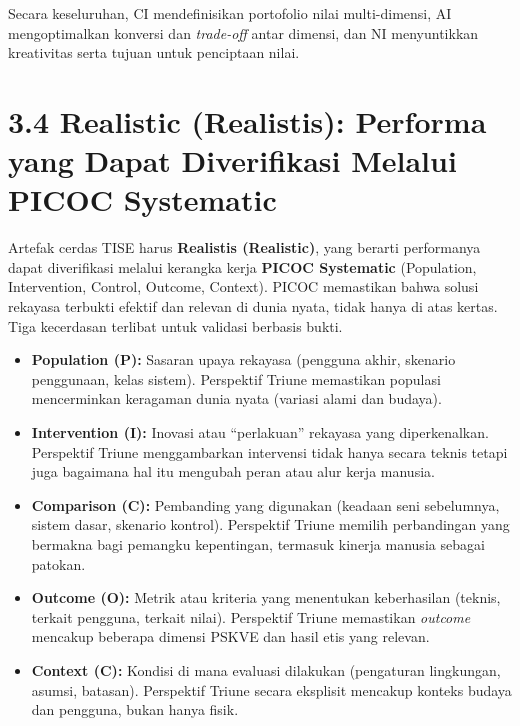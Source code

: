 \documentclass[
  letterpaper,
  DIV=11,
  numbers=noendperiod]{scrreprt}
\providecommand{\tightlist}{%
  \setlength{\itemsep}{0pt}\setlength{\parskip}{0pt}}
\begin{document}
Secara keseluruhan, CI mendefinisikan portofolio nilai multi-dimensi, AI
mengoptimalkan konversi dan \emph{trade-off} antar dimensi, dan NI
menyuntikkan kreativitas serta tujuan untuk penciptaan nilai.

\section{\texorpdfstring{\textbf{3.4 Realistic (Realistis): Performa
yang Dapat Diverifikasi Melalui PICOC
Systematic}}{3.4 Realistic (Realistis): Performa yang Dapat Diverifikasi Melalui PICOC Systematic}}\label{realistic-realistis-performa-yang-dapat-diverifikasi-melalui-picoc-systematic}

Artefak cerdas TISE harus \textbf{Realistis (Realistic)}, yang berarti
performanya dapat diverifikasi melalui kerangka kerja \textbf{PICOC
Systematic} (Population, Intervention, Control, Outcome, Context). PICOC
memastikan bahwa solusi rekayasa terbukti efektif dan relevan di dunia
nyata, tidak hanya di atas kertas. Tiga kecerdasan terlibat untuk
validasi berbasis bukti.

\begin{itemize}
\tightlist
\item
  \textbf{Population (P):} Sasaran upaya rekayasa (pengguna akhir,
  skenario penggunaan, kelas sistem). Perspektif Triune memastikan
  populasi mencerminkan keragaman dunia nyata (variasi alami dan
  budaya).
\item
  \textbf{Intervention (I):} Inovasi atau ``perlakuan'' rekayasa yang
  diperkenalkan. Perspektif Triune menggambarkan intervensi tidak hanya
  secara teknis tetapi juga bagaimana hal itu mengubah peran atau alur
  kerja manusia.
\item
  \textbf{Comparison (C):} Pembanding yang digunakan (keadaan seni
  sebelumnya, sistem dasar, skenario kontrol). Perspektif Triune memilih
  perbandingan yang bermakna bagi pemangku kepentingan, termasuk kinerja
  manusia sebagai patokan.
\item
  \textbf{Outcome (O):} Metrik atau kriteria yang menentukan
  keberhasilan (teknis, terkait pengguna, terkait nilai). Perspektif
  Triune memastikan \emph{outcome} mencakup beberapa dimensi PSKVE dan
  hasil etis yang relevan.
\item
  \textbf{Context (C):} Kondisi di mana evaluasi dilakukan (pengaturan
  lingkungan, asumsi, batasan). Perspektif Triune secara eksplisit
  mencakup konteks budaya dan pengguna, bukan hanya fisik.
\end{itemize}
\end{document}
